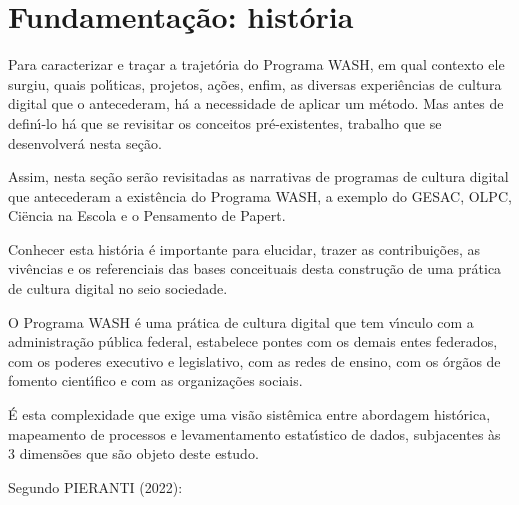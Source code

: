 \documentclass[
12pt,		%
openright,	%
twoside,  %
a4paper,			%
chapter=TITLE,		%
english,			%
french,				%
spanish,			%
brazil				%
]{USPSC-classe/USPSC_RedarTex}
\begin{document}
\section[Fundamenta\c{c}\~ao: hist\'oria]{Fundamenta\c{c}\~ao: hist\'oria}\label{Fundamenta\c{c}\~ao: hist\'oria}
Para caracterizar e tra\c{c}ar a trajet\'oria do Programa WASH, em qual contexto ele surgiu, quais pol\'{\i}ticas, projetos, a\c{c}\~oes, enfim, as diversas experi\^encias de cultura digital que o antecederam, h\'a a necessidade de aplicar um m\'etodo. Mas antes de defin\'{\i}-lo h\'a que se revisitar os conceitos pr\'e-existentes, trabalho que se desenvolver\'a nesta se\c{c}\~ao.








Assim, nesta se\c{c}\~ao ser\~ao revisitadas as narrativas de programas de cultura digital que antecederam a exist\^encia do Programa WASH, a exemplo do GESAC, OLPC, Ciëncia na Escola e o Pensamento de Papert.








Conhecer esta hist\'oria \'e importante para elucidar, trazer as contribui\c{c}\~oes, as viv\^encias e os referenciais das bases conceituais desta constru\c{c}\~ao de uma pr\'atica de cultura digital no seio sociedade.








O Programa WASH \'e uma pr\'atica de cultura digital que tem v\'{\i}nculo com a administra\c{c}\~ao p\'ublica federal, estabelece pontes com os demais entes federados, com os poderes executivo e legislativo, com as redes de ensino, com os \'org\~aos de fomento cient\'{\i}fico e com as organiza\c{c}\~oes sociais.








\'E esta complexidade que exige uma vis\~ao sist\^emica entre abordagem hist\'orica, mapeamento de processos e levamentamento estat\'{\i}stico de dados, subjacentes \`as 3 dimens\~oes que s\~ao objeto deste estudo.








Segundo PIERANTI (2022):
\end{document}
